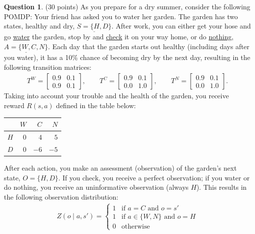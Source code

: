 \documentclass{article}
\theoremstyle{definition}
\newtheorem{question}[thm]{Question}
\begin{document}
\begin{question}(30 points)
    As you prepare for a dry summer, consider the following POMDP: Your friend has asked you to water her garden. The garden has two states, healthy and dry, $\underline{S=\{H,D\}}$. After work, you can either get your hose and go \underline{water} the garden, stop by and \underline{check} it on your way home, or do \underline{nothing}, $\underline{A=\{W,C,N\}}$. Each day that the garden starts out healthy (including days after you water), it has a 10\% chance of becoming dry by the next day, resulting in the following transition matrices:
    \begin{align*}
        T^W = \begin{bmatrix}
            0.9 & 0.1 \\
            0.9 & 0.1
        \end{bmatrix},
        \qquad
        T^C = \begin{bmatrix}
            0.9 & 0.1 \\
            0.0 & 1.0
        \end{bmatrix},
        \qquad
        T^N = \begin{bmatrix}
            0.9 & 0.1 \\
            0.0 & 1.0
        \end{bmatrix}.
    \end{align*}
    Taking into account your trouble and the health of the garden, you receive reward \underline{$R(s,a)$} defined in the table below:
\begin{center}
    \begin{tabular}{c|rrr}
         & $W$ & $C$ & $N$ \\
        \hline
        $H$ & $0$ & $4$ & $5$ \\
        $D$ & $0$ & $-6$ & $-5$
    \end{tabular}
\end{center}
After each action, you make an assessment (observation) of the garden's next state, \underline{$O=\{H,D\}$}. If you check, you receive a perfect observation; if you water or do nothing, you receive an uninformative observation (always $H$). This results in the following observation distribution:
\begin{align*}
    Z(o \mid a, s') = \begin{cases}
        1 & \text{if } a = C \text{ and } o = s' \\
        1 & \text{if } a \in \{W,N\} \text{ and } o = H \\
        0 & \text{otherwise}

\end{cases}
\end{align*}
\end{question}
\end{document}
